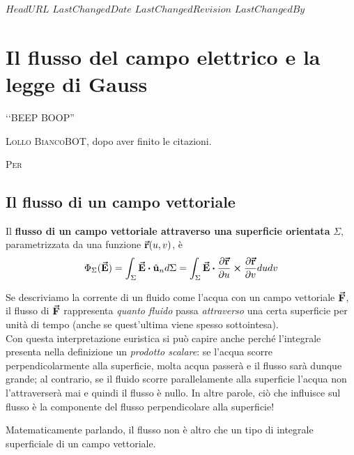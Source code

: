 \svnidlong
{$HeadURL$}
{$LastChangedDate$}
{$LastChangedRevision$}
{$LastChangedBy$}

\chapter{Il flusso del campo elettrico e la legge di Gauss}

\begin{introduction}
	‘‘BEEP BOOP''
	\begin{flushright}
		\textsc{Lollo BiancoBOT}, dopo aver finito le citazioni. %
	\end{flushright}
\end{introduction}
\lettrine[findent=1pt, nindent=0pt]{P}{er}  %
\section{Il flusso di un campo vettoriale}
\begin{define}
	Il \textbf{flusso di un campo vettoriale attraverso una superficie orientata} $\Sigma$, parametrizzata da una funzione $\vb*{\va{r}}(u,v)$, è
	\begin{equation}
		\Phi_{\Sigma}(\vba{E})=\int_{\Sigma}\vba{E}\vdot\vbh{u}_nd\Sigma=\int_{\Sigma}\vba{E}\vdot\frac{\partial \vba{r}}{\partial u}\cross\frac{\partial \vba{r}}{\partial v}dudv
	\end{equation}
\end{define}
\begin{intuit}
	Se descriviamo la corrente di un fluido come l'acqua con un campo vettoriale $\vb*{\va{F}}$, il flusso di $\vb*{\va{F}}$ rappresenta \textit{quanto fluido} passa \textit{attraverso} una certa superficie per unità di tempo (anche se quest'ultima viene spesso sottointesa).\\
	Con questa interpretazione euristica si può capire anche perché l'integrale presenta nella definizione un \textit{prodotto scalare}: se l'acqua scorre perpendicolarmente alla superficie, molta acqua passerà e il flusso sarà dunque grande; al contrario, se il fluido scorre parallelamente alla superficie l'acqua non l'attraverserà mai e quindi il flusso è nullo. In altre parole, ciò che influisce sul flusso è la componente del flusso perpendicolare alla superficie!
\end{intuit}
Matematicamente parlando, il flusso non è altro che un tipo di integrale superficiale di un campo vettoriale. %


